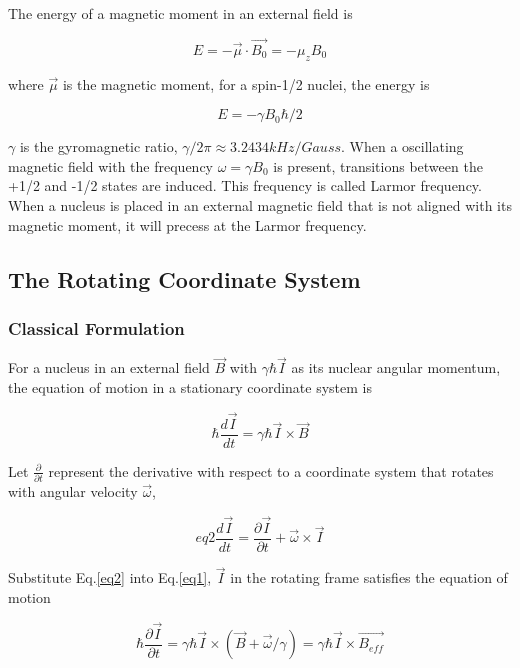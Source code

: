 The energy of a magnetic moment in an external field is

\begin{equation}
E = -\vec{\mu}\cdot \vec{B_{0}} = -\mu_{z}B_{0}
\end{equation}

where $\vec{\mu}$ is the magnetic moment, for a spin-1/2 nuclei, the energy is

\begin{equation}
E = -\gamma B_{0}\hbar/2
\end{equation}

$\gamma$ is the gyromagnetic ratio, $\gamma /2\pi \approx 3.2434kHz/Gauss$. When a oscillating magnetic field with the frequency $\omega=\gamma B_{0}$ is present, transitions between the +1/2 and -1/2 states are induced. This frequency is called Larmor frequency. When a nucleus is placed in an external magnetic field that is not aligned with its magnetic moment, it will precess at the Larmor frequency.

\subsection{The Rotating Coordinate System}

\subsubsection{Classical Formulation}

For a nucleus in an external field $\vec{B}$ with $\gamma \hbar \vec{I}$ as its nuclear angular momentum, the equation of motion in a stationary coordinate system is \cite{RevModPhys.26.167}

\begin{equation}\label{eq1}
\hbar \frac{d\vec{I}}{dt}=\gamma \hbar \vec{I} \times \vec{B}
\end{equation}

Let $\frac{\partial}{\partial t}$ represent the derivative with respect to a coordinate system that rotates with angular velocity $\vec{\omega}$,

\begin{equation}{eq2}
\frac{d\vec{I}}{dt}=\frac{\partial \vec{I}}{\partial t}+\vec{\omega} \times \vec{I}
\end{equation}

Substitute Eq.\@ \ref{eq2} into Eq.\@ \ref{eq1}, $\vec{I}$ in the rotating frame satisfies the equation of motion 

\begin{equation}
\hbar \frac{\partial \vec{I}}{\partial t}=\gamma \hbar \vec{I} \times (\vec{B} + \vec{\omega}/\gamma)=\gamma \hbar \vec{I} \times \vec{B_{eff}}
\end{equation}

